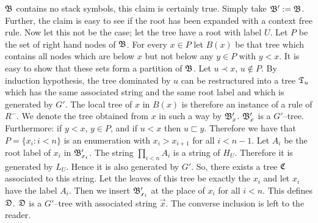 $\mathfrak{B}$ contains no stack symbols, this claim is certainly true.
Simply take $\mathfrak{B}' := \mathfrak{B}$. Further, the claim is easy to see if
the root has been expanded with a context free rule.
Now let this not be the case; let the tree have a root with label
$U$. Let $P$ be the set of right hand nodes of $\mathfrak{B}$. For
every $x \in P$ let $B(x)$ be that tree which contains all nodes
which are below $x$ but not below any $y \in P$ with $y < x$. It
is easy to show that these sets form a partition of $\mathfrak{B}$.
Let $u \prec x$, $u \not\in P$. By induction hypothesis,
the tree dominated by $u$ can be restructured into a tree
$\mathfrak{T}_u$ which has the same associated string and the same
root label and which is generated by $G'$. The local tree of
$x$ in $B(x)$ is therefore an instance of a rule of $R^-$. We
denote the tree obtained from $x$ in such a way by $\mathfrak{B}'_x$.
$\mathfrak{B}'_x$ is a $G'$--tree. Furthermore:  if $y < x$, $y \in P$,
and if $u < x$ then $u \sqsubset y$. Therefore we have
that $P = \{x_i : i < n\}$ is an enumeration with
$x_i > x_{i+1}$ for all $i < n-1$. Let $A_i$ be the root label
of $x_i$ in $\mathfrak{B}'_{x_i}$. The string $\prod_{i < n} A_i$ is a
string of $H_U$. Therefore it is generated by $L_U$. Hence it
is also generated by $G'$. So, there exists a tree $\mathfrak{C}$ associated
to this string. Let the leaves of this tree be exactly the $x_i$ and
let $x_i$ have the label $A_i$. Then we insert $\mathfrak{B}'_{x_i}$ at
the place of $x_i$ for all $i < n$. This defines $\mathfrak{D}$.
$\mathfrak{D}$ is a $G'$--tree with associated string $\vec{x}$. The
converse inclusion is left to the reader.
\proofend

